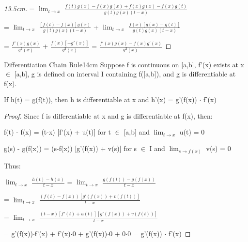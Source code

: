 \begin{enumerate}[label=(\alph*), leftmargin=1cm, itemsep=0.1cm]
\begin{proof}[13.5cm]
                \hspace{3.3cm}
                = $\lim_{t \rightarrow x}$ $\frac{f(t)g(x)-f(x)g(x)+f(x)g(x)-f(x)g(t)}
                                                    {g(t)g(x)(t-x)}$
                
                \hspace{3.3cm}
                = $\lim_{t \rightarrow x}$ $\frac{[f(t)-f(x)]g(x)}{g(t)g(x)(t-x)}$
                + $\lim_{t \rightarrow x}$ $\frac{f(x)[g(x)-g(t)]}{g(t)g(x)(t-x)}$
                
                \hspace{3.3cm}
                = $\frac{f'(x)g(x)}{g^2(x)}$ + $\frac{f(x)[-g'(x)]}{g^2(x)}$
                = $\frac{f'(x)g(x) - f(x)g'(x)}{g^2(x)}$
            \end{proof}
    \end{enumerate}

    \newpage



    \begin{wtheorem}{Differentiation Chain Rule}{14cm}
        Suppose f is continuous on [a,b], f'(x) exists at x $\in$ [a,b],
        g is defined on interval I containing f([a,b]), and
        g is differentiable at f(x).

        If h(t) = g(f(t)), then h is differentiable at x and
        h'(x) = g'(f(x)) $\cdot$ f'(x)
    \end{wtheorem}

    \begin{proof}
        Since f is differentiable at x and g is differentiable at f(x), then:

        \hspace{1cm}
        f(t) - f(x) = (t-x) [f'(x) + u(t)]
        \hspace{2cm}
        for t $\in$ [a,b] and $\lim_{t \rightarrow x}$ u(t) = 0

        \hspace{1cm}
        g(s) - g(f(x)) = (s-f(x)) [g'(f(x)) + v(s)]
        \hspace{0.5cm}
        for s $\in$ I and $\lim_{s \rightarrow f(x)}$ v(s) = 0

        Thus:

        \hspace{1cm}
        $\lim_{t \rightarrow x}$ $\frac{h(t) - h(x)}{t - x}$
        = $\lim_{t \rightarrow x}$ $\frac{g(f(t)) - g(f(x))}{t - x}$

        \hspace{3.8cm}
        = $\lim_{t \rightarrow x}$ $\frac{(f(t) - f(x))[g'(f(x)) + v(f(t))]}{t - x}$

        \hspace{3.8cm}
        = $\lim_{t \rightarrow x}$ $\frac{(t-x) [f'(t) + u(t)]
                                                [g'(f(x)) + v(f(t))]}{t - x}$
        
        \hspace{3.8cm}
        = g'(f(x))$\cdot$f'(x) + f'(x)$\cdot$0 + g'(f(x))$\cdot$0 + 0$\cdot$0
        = g'(f(x)) $\cdot$ f'(x)
    \end{proof}

